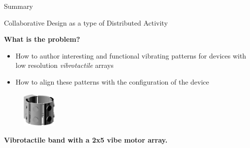 \documentclass[handout]{beamer}
\begin{document}
\begin{frame}{Summary}
\begin{frame}{Collaborative Design as a type of Distributed Activity}
\begin{multicols}{2}
\begin{center}
\textbf{What is the problem?}
\begin{itemize}
\item How to author interesting and functional vibrating patterns for devices with low resolution \textit{vibrotactile} arrays
\item How to align these patterns with the configuration of the device
\end{itemize}

\end{center}
\vspace{2em}


\begin{figure}%
\centering
\includegraphics[width=0.15\textwidth]{graphics/bracelet-02.png}
\end{figure}
\begin{center}
\textbf{Vibrotactile band with a 2x5 vibe motor array.}
\end{center}


\begin{center}
\end{center}


\end{multicols}
\end{frame}
\end{frame}
\end{document}
